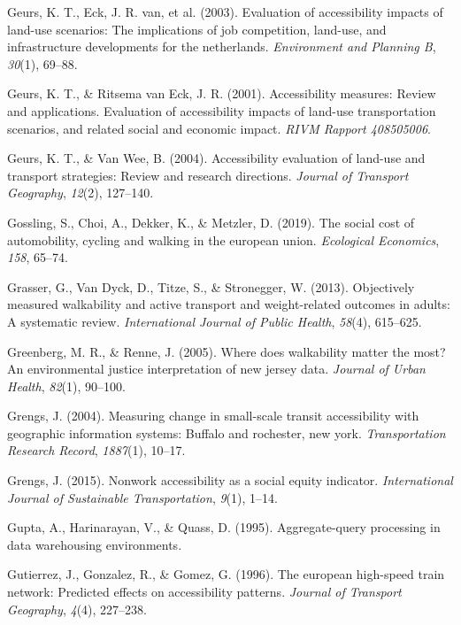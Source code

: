 \documentclass[
11pt, %
oneside, %
english, %
singlespacing, %
]{macthesis} %
\newlength{\cslhangindent}
\newenvironment{CSLReferences}[2] %
{\begin{list}{}{%
	\setlength{\itemindent}{0pt}
	\setlength{\leftmargin}{0pt}
	\setlength{\parsep}{0pt}
	\ifodd #1
	\setlength{\leftmargin}{\cslhangindent}
	\setlength{\itemindent}{-1\cslhangindent}
	\fi
	\setlength{\itemsep}{#2\baselineskip}}}
{\end{list}}
\begin{document}
\begin{CSLReferences}{1}{0}
Geurs, K. T., Eck, J. R. van, et al. (2003). Evaluation of accessibility impacts of land-use scenarios: The implications of job competition, land-use, and infrastructure developments for the netherlands. \emph{Environment and Planning B}, \emph{30}(1), 69--88.

Geurs, K. T., \& Ritsema van Eck, J. R. (2001). Accessibility measures: Review and applications. Evaluation of accessibility impacts of land-use transportation scenarios, and related social and economic impact. \emph{RIVM Rapport 408505006}.

Geurs, K. T., \& Van Wee, B. (2004). Accessibility evaluation of land-use and transport strategies: Review and research directions. \emph{Journal of Transport Geography}, \emph{12}(2), 127--140.

Gossling, S., Choi, A., Dekker, K., \& Metzler, D. (2019). The social cost of automobility, cycling and walking in the european union. \emph{Ecological Economics}, \emph{158}, 65--74.

Grasser, G., Van Dyck, D., Titze, S., \& Stronegger, W. (2013). Objectively measured walkability and active transport and weight-related outcomes in adults: A systematic review. \emph{International Journal of Public Health}, \emph{58}(4), 615--625.

Greenberg, M. R., \& Renne, J. (2005). Where does walkability matter the most? An environmental justice interpretation of new jersey data. \emph{Journal of Urban Health}, \emph{82}(1), 90--100.

Grengs, J. (2004). Measuring change in small-scale transit accessibility with geographic information systems: Buffalo and rochester, new york. \emph{Transportation Research Record}, \emph{1887}(1), 10--17.

Grengs, J. (2015). Nonwork accessibility as a social equity indicator. \emph{International Journal of Sustainable Transportation}, \emph{9}(1), 1--14.

Gupta, A., Harinarayan, V., \& Quass, D. (1995). Aggregate-query processing in data warehousing environments.

Gutierrez, J., Gonzalez, R., \& Gomez, G. (1996). The european high-speed train network: Predicted effects on accessibility patterns. \emph{Journal of Transport Geography}, \emph{4}(4), 227--238.


\end{CSLReferences}
\end{document}
